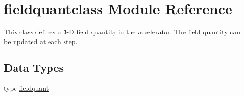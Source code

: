 \hypertarget{namespacefieldquantclass}{}\section{fieldquantclass Module Reference}
\label{namespacefieldquantclass}


This class defines a 3-\/D field quantity in the accelerator. The field quantity can be updated at each step.  


\subsection*{Data Types}
\begin{DoxyCompactItemize}
\item 
type \mbox{\hyperlink{namespacefieldquantclass_structfieldquantclass_1_1fieldquant}{fieldquant}}
\end{DoxyCompactItemize}
